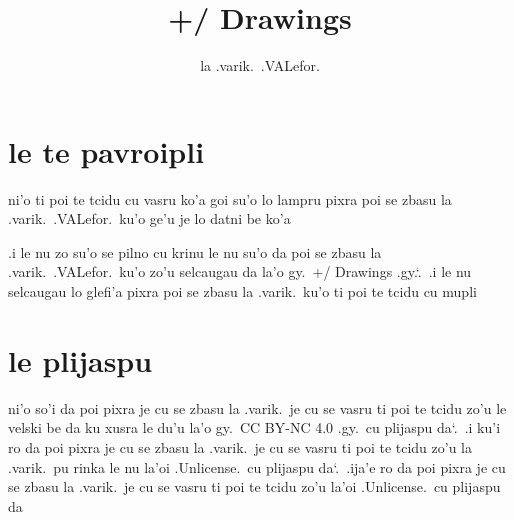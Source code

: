 \documentclass{report}
\title{+/ Drawings}
\author{la .varik.\ .VALefor.}
\newcommand\sds{\spacefactor\sfcode`.\ \space}
\begin{document}
\maketitle{}
\tableofcontents{}
\chapter{le te pavroipli}
ni'o ti poi te tcidu cu vasru ko'a goi su'o lo lampru pixra poi se zbasu la .varik.\ .VALefor.\ ku'o ge'u je lo datni be ko'a

.i le nu zo su'o se pilno cu krinu le nu su'o da poi se zbasu la .varik.\ .VALefor.\ ku'o zo'u selcaugau da la'o gy.\ +/ Drawings .gy.\sds  .i le nu selcaugau lo glefi'a pixra poi se zbasu la .varik.\ ku'o ti poi te tcidu cu mupli

\chapter{le plijaspu}
ni'o so'i da poi pixra je cu se zbasu la .varik.\ je cu se vasru ti poi te tcidu zo'u le velski be da ku xusra le du'u la'o gy.\ CC BY-NC 4.0 .gy.\ cu plijaspu da\sds  .i ku'i ro da poi pixra je cu se zbasu la .varik.\ je cu se vasru ti poi te tcidu zo'u la .varik.\ pu rinka le nu la'oi .Unlicense.\ cu plijaspu da\sds  .ija'e ro da poi pixra je cu se zbasu la .varik.\ je cu se vasru ti poi te tcidu zo'u la'oi .Unlicense.\ cu plijaspu da
\end{document}
